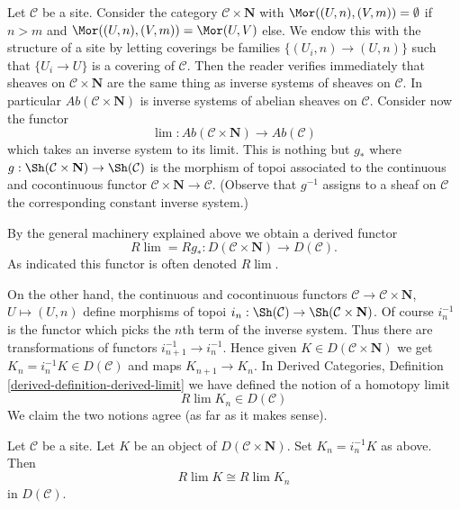 \noindent
Let $\mathcal{C}$ be a site. Consider the category
$\mathcal{C} \times \mathbf{N}$ with
$\Mor((U, n), (V, m)) = \emptyset$ if $n > m$ and
$\Mor((U, n), (V, m)) = \Mor(U, V)$ else. We endow this with the
structure of a site by letting coverings
be families $\{(U_i, n) \to (U, n)\}$ such that
$\{U_i \to U\}$ is a covering of $\mathcal{C}$.
Then the reader verifies immediately that
sheaves on $\mathcal{C} \times \mathbf{N}$ are the same thing
as inverse systems of sheaves on $\mathcal{C}$.
In particular $\textit{Ab}(\mathcal{C} \times \mathbf{N})$
is inverse systems of abelian sheaves on $\mathcal{C}$.
Consider now the functor
$$
\lim : \textit{Ab}(\mathcal{C} \times \mathbf{N}) \to \textit{Ab}(\mathcal{C})
$$
which takes an inverse system to its limit. This is nothing but
$g_*$ where $g : \Sh(\mathcal{C} \times \mathbf{N}) \to \Sh(\mathcal{C})$
is the morphism of topoi associated to the continuous and cocontinuous functor
$\mathcal{C} \times \mathbf{N} \to \mathcal{C}$. (Observe that
$g^{-1}$ assigns to a sheaf on $\mathcal{C}$ the corresponding
constant inverse system.)

\medskip\noindent
By the general machinery explained above we obtain a derived functor
$$
R\lim = Rg_* : D(\mathcal{C} \times \mathbf{N}) \to D(\mathcal{C}).
$$
As indicated this functor is often denoted $R\lim$.

\medskip\noindent
On the other hand, the continuous and cocontinuous functors
$\mathcal{C} \to \mathcal{C} \times \mathbf{N}$,
$U \mapsto (U, n)$ define morphisms of topoi
$i_n : \Sh(\mathcal{C}) \to \Sh(\mathcal{C} \times \mathbf{N})$.
Of course $i_n^{-1}$ is the functor which picks the $n$th term of
the inverse system. Thus there are transformations of functors
$i_{n + 1}^{-1} \to i_n^{-1}$. Hence given
$K \in D(\mathcal{C} \times \mathbf{N})$ we get
$K_n = i_n^{-1}K \in D(\mathcal{C})$ and maps $K_{n + 1} \to K_n$.
In Derived Categories, Definition \ref{derived-definition-derived-limit}
we have defined the notion of a homotopy limit
$$
R\lim K_n \in D(\mathcal{C})
$$
We claim the two notions agree (as far as it makes sense).

\begin{lemma}
\label{lemma-derived-limit-is-ok}
Let $\mathcal{C}$ be a site. Let $K$ be an object of
$D(\mathcal{C} \times \mathbf{N})$. Set $K_n = i_n^{-1}K$ as above.
Then
$$
R\lim K \cong R\lim K_n
$$
in $D(\mathcal{C})$.
\end{lemma}

